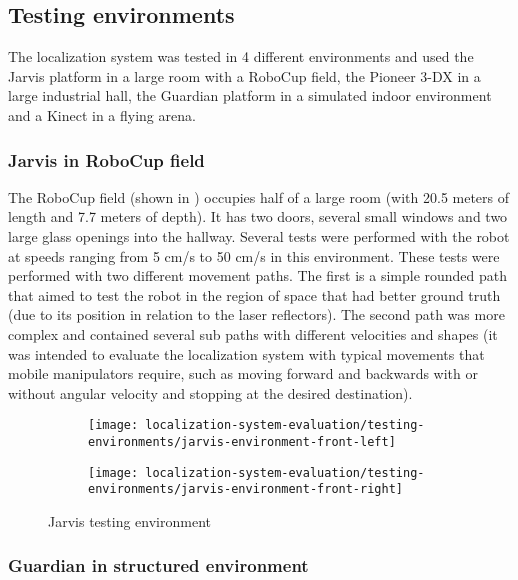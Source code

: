 \subsection{Testing environments}

The localization system was tested in 4 different environments and used the Jarvis platform in a large room with a RoboCup field, the Pioneer 3-DX in a large industrial hall, the Guardian platform in a simulated indoor environment and a Kinect in a flying arena.


\subsubsection{Jarvis in RoboCup field}

The RoboCup field (shown in ) occupies half of a large room (with 20.5 meters of length and 7.7 meters of depth). It has two doors, several small windows and two large glass openings into the hallway. Several tests were performed with the robot at speeds ranging from 5 cm/s to 50 cm/s in this environment. These tests were performed with two different movement paths. The first is a simple rounded path that aimed to test the robot in the region of space that had better ground truth (due to its position in relation to the laser reflectors). The second path was more complex and contained several sub paths with different velocities and shapes (it was intended to evaluate the localization system with typical movements that mobile manipulators require, such as moving forward and backwards with or without angular velocity and stopping at the desired destination).


\begin{figure}[H]
	\centering
	\begin{subfigure}[ht]{0.45\textwidth}
		\centering
		\texttt{[image: localization-system-evaluation/testing-environments/jarvis-environment-front-left]}
	\end{subfigure}
	\begin{subfigure}[ht]{0.45\textwidth}
		\centering
		\texttt{[image: localization-system-evaluation/testing-environments/jarvis-environment-front-right]}
	\end{subfigure}
	\caption{Jarvis testing environment}
	\label{fig:localization-system-evaluation_jarvis-tests-environment}
\end{figure}


\subsubsection{Guardian in structured environment}

